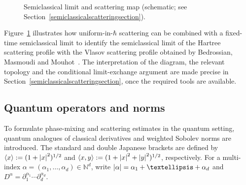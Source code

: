 \documentclass[10pt,a4paper]{amsart}
\theoremstyle{plain}
\theoremstyle{remark}
\newcommand{\p}{\partial}
\newcommand{\jb}[1]{\langle#1\rangle}
\begin{document}
\begin{figure}[ht]
\vspace{0cm}
\centering
{}
\captionsetup{width=.8\linewidth}
\caption{Semiclassical limit and scattering map (schematic; see Section~\ref{semiclassicalscatteringsection}).}
\label{map}
\end{figure}
Figure~\ref{map} illustrates how uniform-in-$\hbar$ scattering can be combined with a fixed-time semiclassical limit to identify the semiclassical limit of the Hartree scattering profile with the Vlasov scattering profile obtained by Bedrossian, Masmoudi and Mouhot~\cite{BedrossianMasmoudiMouhot2018}. The interpretation of the diagram, the relevant topology and the conditional limit-exchange argument are made precise in Section~\ref{semiclassicalscatteringsection}, once the required tools are available.

\subsection{Quantum operators and norms} To formulate phase-mixing and scattering estimates in the quantum setting, quantum analogues of classical derivatives and weighted Sobolev norms are introduced. The standard and double Japanese brackets are defined by $\jb{x}:=(1+\abs{x}^2)^{1/2}$ and $\jb{x,y}:=(1+\abs{x}^2+\abs{y}^2)^{1/2}$, respectively. For a multi-index $\alpha=(\alpha_1,\dots,\alpha_d)\in\mathbb N^d$, write
$\abs{\alpha}=\alpha_1+\dots+\alpha_d$ and $D^{\alpha}=\p_1^{\alpha_1}\cdots\p_d^{\alpha_d}$.
\end{document}
